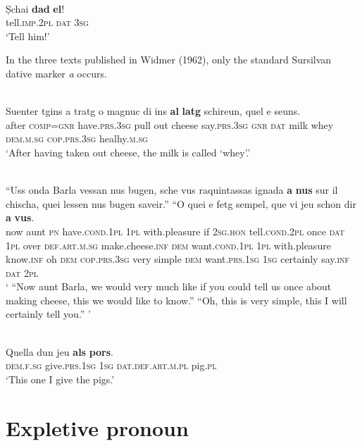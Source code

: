 {\ea\label{}
\\
\gll    Ṣchai \textbf{dad} \textbf{el}!\\
    tell.\textsc{imp.2pl} \textsc{dat} \textsc{3sg}\\
\glt `Tell him!'
\z

In the three texts published in Widmer (1962), only the standard Sursilvan dative marker \textit{a} occurs.

\ea\label{}
\\
\gll Suenter tgins a tratg o magnuc di ins \textbf{al} \textbf{latg} schireun, quel e seuns. \\
    after \textsc{comp=gnr} have.\textsc{prs.3sg} pull out cheese say.\textsc{prs.3sg} \textsc{gnr} \textsc{dat} milk  whey \textsc{dem.m.sg} \textsc{cop.prs.3sg} healhy.\textsc{m.sg} \\
\glt `After having taken out cheese, the milk is called `whey'.'
\z


\ea\label{}
\\
\gll  “Uss onda Barla vessan nus bugen, sche vus raquintassas ignada \textbf{a} \textbf{nus} sur il chischa, quei lessen nus bugen saveir.” “O quei e fetg sempel, que vi jeu schon dir \textbf{a} \textbf{vus}.\\
     now aunt \textsc{pn} have.\textsc{cond.1pl} \textsc{1pl} with.pleasure if \textsc{2sg.hon} tell.\textsc{cond.2pl} once \textsc{dat} \textsc{1pl} over \textsc{def.art.m.sg} make.cheese.\textsc{inf} \textsc{dem} want.\textsc{cond.1pl} \textsc{1pl} with.pleasure know.\textsc{inf} oh \textsc{dem} \textsc{cop.prs.3sg} very simple \textsc{dem} want.\textsc{prs.1sg} \textsc{1sg} certainly say.\textsc{inf} \textsc{dat} \textsc{2pl} \\
\glt ` “Now aunt Barla, we would very much like if you could tell us once about making cheese, this we would like to know.” “Oh, this is very simple, this I will certainly tell you.” '
\z

\ea\label{}
\\
\gll   Quella dun jeu \textbf{als} \textbf{pors}.\\
    \textsc{dem.f.sg} give.\textsc{prs.1sg} \textsc{1sg} \textsc{dat.def.art.m.pl} pig.\textsc{pl}\\
\glt `This one I give the pigs.'
\z



\section{Expletive pronoun} 
 
}
